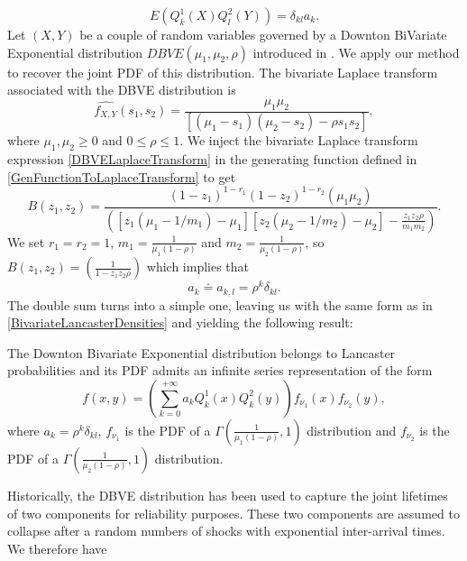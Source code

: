 \begin{equation}\label{BiOrthogonalityCondition}
E\left(Q_{k}^{1}(X)Q_{l}^{2}(Y)\right)=\delta_{kl}a_{k}. 
\end{equation}
Let $(X,Y)$ be a couple of random variables governed by a Downton BiVariate Exponential distribution $DBVE(\mu_{1},\mu_{2},\rho)$ introduced in \cite{Do70}. We apply our method to recover the joint PDF of this distribution. The bivariate Laplace transform associated with the DBVE distribution is
\begin{equation}\label{DBVELaplaceTransform}
\widehat{f_{X,Y}}(s_{1},s_{2})=\frac{\mu_{1}\mu_{2}}{\left[(\mu_{1}-s_{1})(\mu_{2}-s_{2})-\rho s_{1}s_{2}\right]},
\end{equation}
where $\mu_{1},\mu_{2}\geq0$ and $0\leq\rho\leq 1$. We inject the bivariate Laplace transform expression \eqref{DBVELaplaceTransform} in the generating function defined in \eqref{GenFunctionToLaplaceTransform} to get
\begin{equation}\label{CoefficientGeneratingFunctionDBVE}
B(z_{1},z_{2})=\frac{(1-z_{1})^{1-r_{1}}(1-z_{2})^{1-r_{2}}(\mu_{1}\mu_{2})}{\left(\left[z_{1}(\mu_{1}-1/m_{1})-\mu_{1}\right]\left[z_{2}(\mu_{2}-1/m_{2})-\mu_{2}\right]-\frac{z_{1}z_{2}\rho}{m_{1}m_{2}}\right)}.
\end{equation}
We set $r_{1}=r_{2}=1$, $m_{1}=\frac{1}{\mu_{1}(1-\rho)}$ and $m_{2}=\frac{1}{\mu_{2}(1-\rho)}$, so $B(z_{1},z_{2})=\left(\frac{1}{1-z_{1}z_{2}\rho}\right)$ which implies that
 \begin{equation}
a_{k}\doteq a_{k,l}=\rho^{k}\delta_{kl}.
\end{equation}  
The double sum turns into a simple one, leaving us with the same form as in \eqref{BivariateLancasterDensities} and yielding the following result:
\begin{Prop}
The Downton Bivariate Exponential distribution belongs to Lancaster probabilities and its PDF admits an infinite series representation of the form 
\begin{equation}\label{MPDFExpansion2}
f(x,y)=\left(\sum_{k=0}^{+\infty}a_{k}Q_{k}^{1}(x)Q_{k}^{2}(y)\right)f_{\nu_{1}}(x)f_{\nu_{2}}(y),
\end{equation} 
where $a_{k}=\rho^{k}\delta_{kl}$, $f_{\nu_{1}}$ is the PDF of a $\Gamma\left(\frac{1}{\mu_{1}(1-\rho)},1\right)$ distribution and $f_{\nu_{2}}$ is the PDF of a $\Gamma\left(\frac{1}{\mu_{2}(1-\rho)},1\right)$ distribution.         
\end{Prop}
Historically, the DBVE distribution has been used to capture the joint lifetimes of two components for reliability purposes. These two components are assumed to collapse after a random numbers of shocks with exponential inter-arrival times. We therefore have 
